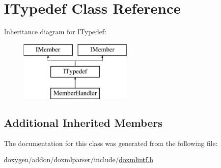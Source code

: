 \hypertarget{class_i_typedef}{}\section{I\+Typedef Class Reference}
\label{class_i_typedef}
Inheritance diagram for I\+Typedef\+:\begin{figure}[H]
\begin{center}
\leavevmode
\includegraphics[height=3.000000cm]{class_i_typedef}
\end{center}
\end{figure}
\subsection*{Additional Inherited Members}


The documentation for this class was generated from the following file\+:\begin{DoxyCompactItemize}
\item 
doxygen/addon/doxmlparser/include/\mbox{\hyperlink{include_2doxmlintf_8h}{doxmlintf.\+h}}\end{DoxyCompactItemize}
